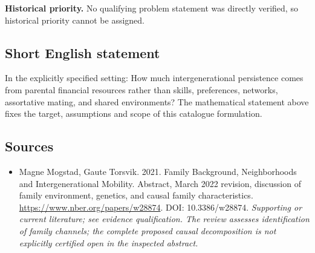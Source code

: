 \documentclass[11pt]{article}
\begin{document}
\par\textbf{Historical priority.} No qualifying problem statement was directly verified, so historical priority cannot be assigned.

\subsection{Short English statement}
In the explicitly specified setting: How much intergenerational persistence comes from parental financial resources rather than skills, preferences, networks, assortative mating, and shared environments? The mathematical statement above fixes the target, assumptions and scope of this catalogue formulation.

\subsection{Sources}
\begin{itemize}\raggedright
\item[\textnormal{[S1]}]\hypertarget{source:30007645:1}{} Magne Mogstad, Gaute Torsvik. 2021. Family Background, Neighborhoods and Intergenerational Mobility. Abstract, March 2022 revision, discussion of family environment, genetics, and causal family characteristics.
\url{https://www.nber.org/papers/w28874}.
DOI: 10.3386/w28874.
{\small\textit{Supporting or current literature; see evidence qualification. The review assesses identification of family channels; the complete proposed causal decomposition is not explicitly certified open in the inspected abstract.}}
\end{itemize}
\end{document}
